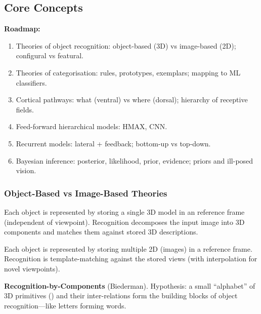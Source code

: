 \subsection{Core Concepts}

\textbf{Roadmap:}
\begin{enumerate}
  \item Theories of object recognition: object-based (3D) vs image-based (2D); configural vs featural.
  \item Theories of categorisation: rules, prototypes, exemplars; mapping to ML classifiers.
  \item Cortical pathways: what (ventral) vs where (dorsal); hierarchy of receptive fields.
  \item Feed-forward hierarchical models: HMAX, CNN.
  \item Recurrent models: lateral + feedback; bottom-up vs top-down.
  \item Bayesian inference: posterior, likelihood, prior, evidence; priors and ill-posed vision.
\end{enumerate}

\bigseparator

\subsubsection{Object-Based vs Image-Based Theories}

\begin{defbox}
Each object is represented by storing a single 3D model in an  reference frame (independent of viewpoint). Recognition decomposes the input image into 3D components and matches them against stored 3D descriptions.
\end{defbox}

\begin{defbox}
Each object is represented by storing multiple 2D  (images) in a  reference frame. Recognition is template-matching against the stored views (with interpolation for novel viewpoints).
\end{defbox}

\textbf{Recognition-by-Components} (Biederman). Hypothesis: a small ``alphabet'' of 3D primitives () and their inter-relations form the building blocks of object recognition---like letters forming words.

